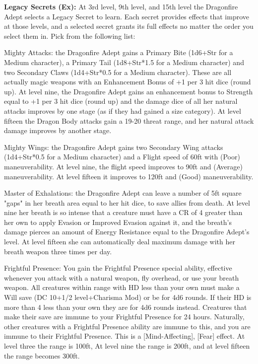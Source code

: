 \textbf{Legacy Secrets (Ex):} At 3rd level, 9th level, and 15th level the Dragonfire Adept selects a Legacy Secret to learn. Each secret provides effects that improve at those levels, and a selected secret grants its full effects no matter the order you select them in. Pick from the following list:

\begin{description*}
\item[Mighty Attacks:] the Dragonfire Adept gains a Primary Bite (1d6+Str for a Medium character), a Primary Tail (1d8+Str*1.5 for a Medium character) and two Secondary Claws (1d4+Str*0.5 for a Medium character). These are all actually magic weapons with an Enhancement Bonus of +1 per 3 hit dice (round up). At level nine, the Dragonfire Adept gains an enhancement bonus to Strength equal to +1 per 3 hit dice (round up) and the damage dice of all her natural attacks improves by one stage (as if they had gained a size category). At level fifteen the Dragon Body attacks gain a 19-20 threat range, and her natural attack damage improves by another stage.
\item[Mighty Wings:] the Dragonfire Adept gains two Secondary Wing attacks (1d4+Str*0.5 for a Medium character) and a Flight speed of 60ft with (Poor) maneuverability. At level nine, the flight speed improves to 90ft  and (Average) maneuverability. At level fifteen it improves to 120ft and (Good) maneuverability.
\item[Master of Exhalations:] the Dragonfire Adept can leave a number of 5ft square "gaps" in her breath area equal to her hit dice, to save allies from death. At level nine her breath is so intense that a creature must have a CR of 4 greater than her own to apply Evasion or Improved Evasion against it, and the breath's damage pierces an amount of Energy Resistance equal to the Dragonfire Adept's level. At level fifteen she can automatically deal maximum damage with her breath weapon three times per day.
\item[Frightful Presence:] You gain the Frightful Presence special ability, effective whenever you attack with a natural weapon, fly overhead, or use your breath weapon. All creatures within range with HD less than your own must make a Will save (DC 10+1/2 level+Charisma Mod) or be  for 4d6 rounds. If their HD is more than 4 less than your own they are  for 4d6 rounds instead. Creatures that make their save are immune to your Frightful Presence for 24 hours. Naturally, other creatures with a Frightful Presence ability are immune to this, and you are immune to their Frightful Presence. This is a [Mind-Affecting], [Fear] effect. At level three the range is 100ft, At level nine the range is 200ft, and at level fifteen the range becomes 300ft.

\end{description*}
